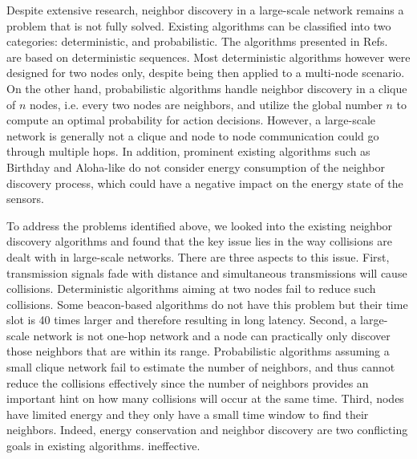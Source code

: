 Despite extensive research, neighbor discovery in a large-scale network
remains a problem that is not fully solved.
Existing algorithms can be classified into two categories: deterministic, and probabilistic.
The algorithms presented in
Refs.~\cite{dutta2008practical, kandhalu2010u, bakht2012searchlight,
sun2014hello, chen2015heterogeneous, qiu2016talk} are %
based on deterministic sequences.
Most deterministic algorithms however were designed for two
nodes only, despite being then applied to a multi-node scenario.
On the other hand,
probabilistic algorithms handle neighbor discovery in a clique of $n$
nodes\cite{mcglynn2001birthday, vasudevan2009neighbor, you2011aloha,
song2014probabilistic}, i.e. every two nodes are neighbors, and utilize
the global number $n$ to compute an optimal probability for action
decisions. However, a large-scale network is generally not a clique and
node to node communication could go through multiple hops.
In addition, prominent existing
algorithms such as Birthday \cite{mcglynn2001birthday} and Aloha-like
\cite{vasudevan2009neighbor} do not consider energy consumption of the
neighbor discovery process, which could have a negative impact on the
energy state of the sensors.

To address the problems identified above, we looked into the existing
neighbor discovery algorithms and found that the key issue lies in the
way collisions are dealt with in large-scale networks.
There are three aspects to this issue.
First, transmission signals fade with distance and simultaneous
transmissions will cause collisions. %
Deterministic algorithms aiming at two nodes \cite{kandhalu2010u,
chen2015heterogeneous} fail to reduce such collisions. Some beacon-based
algorithms \cite{dutta2008practical, bakht2012searchlight, sun2014hello,
qiu2016talk} do not have this problem but their time slot is 40 times
larger \cite{kandhalu2010u} and therefore resulting in long latency. 
Second, a large-scale network is not one-hop network and a node can
practically only discover those neighbors that are within its range.
Probabilistic algorithms
\cite{vasudevan2009neighbor, you2011aloha, song2014probabilistic}
assuming a small clique network fail to estimate the number of
neighbors, and thus cannot reduce the collisions effectively since the
number of neighbors provides an important hint on how many collisions
will occur at the same time.
Third, nodes have limited energy and they only have a small time window
to find their neighbors. Indeed, energy conservation and
neighbor discovery are two conflicting goals in existing algorithms.
ineffective.

